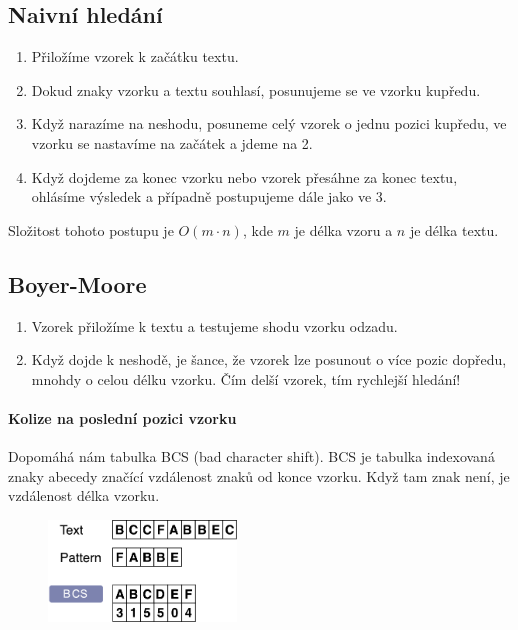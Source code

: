 \subsection{Naivní hledání}
\begin{enumerate}
\item Přiložíme vzorek k začátku textu.
\item Dokud znaky vzorku a textu souhlasí, posunujeme se ve vzorku kupředu.
\item Když narazíme na neshodu, posuneme celý vzorek o jednu pozici kupředu, ve vzorku se nastavíme na začátek a jdeme na 2.
\item Když dojdeme za konec vzorku nebo vzorek přesáhne za konec textu, ohlásíme výsledek a případně postupujeme dále jako ve 3.
\end{enumerate}

Složitost tohoto postupu je $O(m \cdot n)$, kde $m$ je délka vzoru a $n$ je délka textu.

\subsection{Boyer-Moore}
\begin{enumerate}
\item Vzorek přiložíme k textu a testujeme shodu vzorku odzadu.
\item Když dojde k neshodě, je šance, že vzorek lze posunout o více pozic dopředu, mnohdy o celou délku vzorku. Čím delší vzorek, tím rychlejší hledání!
\end{enumerate}
\paragraph{Kolize na poslední pozici vzorku}
Dopomáhá nám tabulka BCS (bad character shift). BCS je tabulka indexovaná znaky abecedy značící vzdálenost znaků od konce vzorku. Když tam znak není, je vzdálenost délka vzorku.

\begin{figure}[h]
    \begin{center}
        \includegraphics[width=50mm]{04/images/bcs}
    \end{center}
\end{figure}

